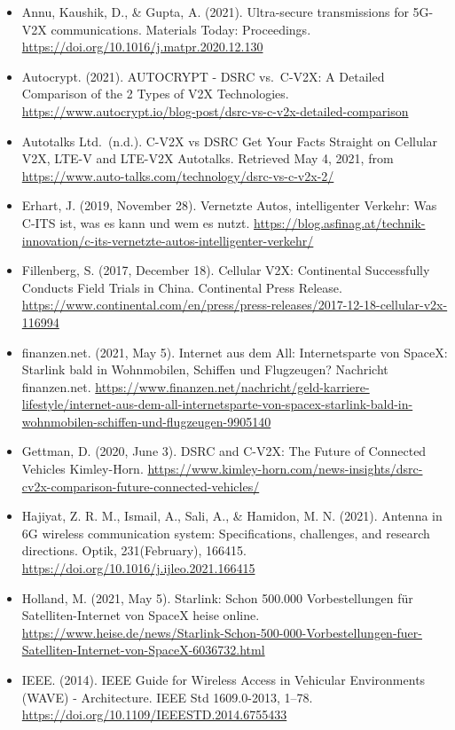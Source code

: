 \documentclass[
]{book}
\providecommand{\tightlist}{%
  \setlength{\itemsep}{0pt}\setlength{\parskip}{0pt}}
\begin{document}
\begin{itemize}
\tightlist
\item
  Annu, Kaushik, D., \& Gupta, A. (2021). Ultra-secure transmissions for 5G-V2X communications. Materials Today: Proceedings. \url{https://doi.org/10.1016/j.matpr.2020.12.130}
\item
  Autocrypt. (2021). AUTOCRYPT - DSRC vs.~C-V2X: A Detailed Comparison of the 2 Types of V2X Technologies. \url{https://www.autocrypt.io/blog-post/dsrc-vs-c-v2x-detailed-comparison}
\item
  Autotalks Ltd.~(n.d.). C-V2X vs DSRC \textbar{} Get Your Facts Straight on Cellular V2X, LTE-V and LTE-V2X Autotalks. Retrieved May 4, 2021, from \url{https://www.auto-talks.com/technology/dsrc-vs-c-v2x-2/}
\item
  Erhart, J. (2019, November 28). Vernetzte Autos, intelligenter Verkehr: Was C-ITS ist, was es kann und wem es nutzt. \url{https://blog.asfinag.at/technik-innovation/c-its-vernetzte-autos-intelligenter-verkehr/}
\item
  Fillenberg, S. (2017, December 18). Cellular V2X: Continental Successfully Conducts Field Trials in China. Continental Press Release. \url{https://www.continental.com/en/press/press-releases/2017-12-18-cellular-v2x-116994}
\item
  finanzen.net. (2021, May 5). Internet aus dem All: Internetsparte von SpaceX: Starlink bald in Wohnmobilen, Schiffen und Flugzeugen? \textbar{} Nachricht \textbar{} finanzen.net. \url{https://www.finanzen.net/nachricht/geld-karriere-lifestyle/internet-aus-dem-all-internetsparte-von-spacex-starlink-bald-in-wohnmobilen-schiffen-und-flugzeugen-9905140}
\item
  Gettman, D. (2020, June 3). DSRC and C-V2X: The Future of Connected Vehicles \textbar{} Kimley-Horn. \url{https://www.kimley-horn.com/news-insights/dsrc-cv2x-comparison-future-connected-vehicles/}
\item
  Hajiyat, Z. R. M., Ismail, A., Sali, A., \& Hamidon, M. N. (2021). Antenna in 6G wireless communication system: Specifications, challenges, and research directions. Optik, 231(February), 166415. \url{https://doi.org/10.1016/j.ijleo.2021.166415}
\item
  Holland, M. (2021, May 5). Starlink: Schon 500.000 Vorbestellungen für Satelliten-Internet von SpaceX \textbar{} heise online. \url{https://www.heise.de/news/Starlink-Schon-500-000-Vorbestellungen-fuer-Satelliten-Internet-von-SpaceX-6036732.html}
\item
  IEEE. (2014). IEEE Guide for Wireless Access in Vehicular Environments (WAVE) - Architecture. IEEE Std 1609.0-2013, 1--78. \url{https://doi.org/10.1109/IEEESTD.2014.6755433}

\end{itemize}
\end{document}
